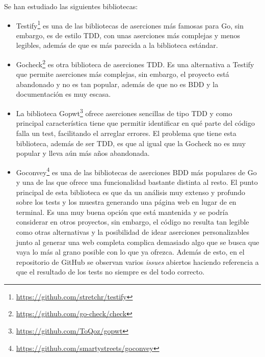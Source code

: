 Se han estudiado las siguientes bibliotecas:
\begin{itemize}
    \item Testify\footnote{\url{https://github.com/stretchr/testify}} es una de
    las bibliotecas de aserciones más famosas para Go, sin embargo, es de estilo
    TDD, con unas aserciones más complejas y menos legibles, además de que es
    más parecida a la biblioteca estándar.
    \item Gocheck\footnote{\url{https://github.com/go-check/check}} es otra
    biblioteca de aserciones TDD. Es una alternativa a Testify que permite
    aserciones más complejas, sin embargo, el proyecto está abandonado y no es
    tan popular, además de que no es BDD y la documentación es muy escasa.
    \item La biblioteca Gopwt\footnote{\url{https://github.com/ToQoz/gopwt}}
    ofrece aserciones sencillas de tipo TDD y como principal característica
    tiene que permitir identificar en qué parte del código falla un test,
    facilitando el arreglar errores. El problema que tiene esta biblioteca,
    además de ser TDD, es que al igual que la Gocheck no es muy popular y lleva
    aún más años abandonada. 
    \item Goconvey\footnote{\url{https://github.com/smartystreets/goconvey}} es
    una de las bibliotecas de aserciones BDD más populares de Go y una de las
    que ofrece una funcionalidad bastante distinta al resto. El punto principal
    de esta biblioteca es que da un análisis muy extenso y profundo sobre los
    tests y los muestra generando una página web en lugar de en terminal. Es una
    muy buena opción que está mantenida y se podría considerar en otros
    proyectos, sin embargo, el código no resulta tan legible como otras
    alternativas y la posibilidad de idear aserciones personalizables junto al
    generar una web completa complica demasiado algo que se busca que vaya lo
    más al grano posible con lo que ya ofrezca. Además de esto, en el
    repositorio de GitHub se observan varios \textit{issues} abiertos haciendo
    referencia a que el resultado de los tests no siempre es del todo correcto.
\end{itemize}

